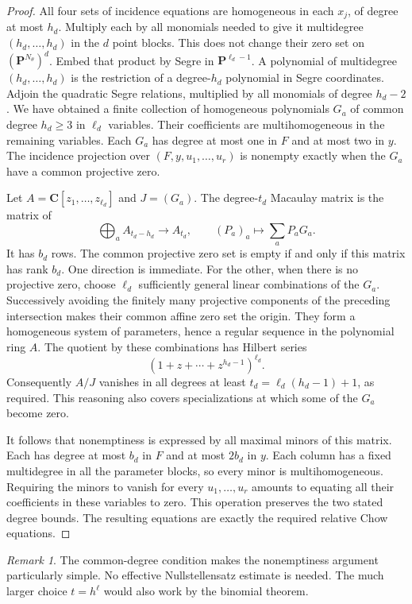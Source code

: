 \documentclass[11pt]{article}
\theoremstyle{definition}
\theoremstyle{remark}
\newtheorem{remark}[theorem]{Remark}
\begin{document}
\begin{proof}
All four sets of incidence equations are homogeneous in each
$x_j$, of degree at most $h_d$.  Multiply each by all monomials
needed to give it multidegree $(h_d,\ldots,h_d)$ in the $d$
point blocks.  This does not change their zero set on
$(\mathbf P^{N_\theta})^d$.  Embed that product by Segre in
$\mathbf P^{\ell_d-1}$.  A polynomial of multidegree
$(h_d,\ldots,h_d)$ is the restriction of a degree-$h_d$
polynomial in Segre coordinates.  Adjoin the quadratic Segre
relations, multiplied by all monomials of degree $h_d-2$.
We have obtained a finite collection of homogeneous polynomials
$G_a$ of common degree $h_d\geq3$ in $\ell_d$ variables.  Their
coefficients are multihomogeneous in the remaining variables.
Each $G_a$ has degree at most one in $F$ and at most two in $y$.
The incidence projection over $(F,y,u_1,\ldots,u_r)$ is nonempty
exactly when the $G_a$ have a common projective zero.

Let $A=\mathbf C[z_1,\ldots,z_{\ell_d}]$ and
$J=(G_a)$.  The degree-$t_d$ Macaulay matrix is the matrix of
\[
 \bigoplus_a A_{t_d-h_d}\longrightarrow A_{t_d},\qquad
 (P_a)_a\longmapsto\sum_aP_aG_a.
\]
It has $b_d$ rows.  The common projective zero set is empty if and
only if this matrix has rank $b_d$.  One direction is immediate.
For the other, when there is no projective zero, choose
$\ell_d$ sufficiently general linear combinations of the $G_a$.
Successively avoiding the finitely many projective components
of the preceding intersection makes their common affine zero
set the origin.  They form a homogeneous system of parameters,
hence a regular sequence in the polynomial ring $A$.
The quotient by these combinations has Hilbert series
\[
 (1+z+\cdots+z^{h_d-1})^{\ell_d}.
\]
Consequently $A/J$ vanishes in all degrees at least
$t_d=\ell_d(h_d-1)+1$, as required.
This reasoning also covers specializations at which
some of the $G_a$ become zero.

It follows that nonemptiness is expressed by all maximal minors
of this matrix.  Each has degree at most $b_d$ in $F$ and at most
$2b_d$ in $y$.  Each column has a fixed multidegree in all the
parameter blocks, so every minor is multihomogeneous.  Requiring
the minors to vanish for every $u_1,\ldots,u_r$ amounts to
equating all their coefficients in these variables to zero.
This operation preserves the two stated degree bounds.  The
resulting equations are exactly the required relative Chow
equations.
\end{proof}

\begin{remark}
The common-degree condition makes the nonemptiness argument
particularly simple.  No effective Nullstellensatz estimate is
needed.  The much larger choice $t=h^\ell$ would also work by
the binomial theorem.
\end{remark}
\end{document}
